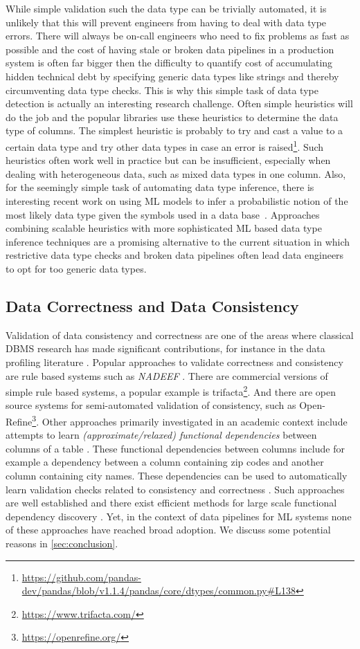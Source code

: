While simple validation such the data type can be trivially automated, it is unlikely that this will prevent engineers from having to deal with data type errors. There will always be on-call engineers who need to fix problems as fast as possible and the cost of having stale or broken data pipelines in a production system is often far bigger then the difficulty to quantify cost of accumulating hidden technical debt by specifying generic data types like strings and thereby circumventing data type checks. This is why this simple task of data type detection is actually an interesting research challenge. Often simple heuristics will do the job and the popular libraries use these heuristics to determine the data type of columns. The simplest heuristic is probably to try and cast a value to a certain data type and try other data types in case an error is raised\footnote{\url{https://github.com/pandas-dev/pandas/blob/v1.1.4/pandas/core/dtypes/common.py\#L138}}. Such heuristics often work well in practice but can be insufficient, especially when dealing with heterogeneous data, such as mixed data types in one column. Also, for the seemingly simple task of automating data type inference, there is interesting recent work on using ML models to infer a probabilistic notion of the most likely data type given the symbols used in a data base~\cite{Ceritli2020}. Approaches combining scalable heuristics with more sophisticated ML based data type inference techniques are a promising alternative to the current situation in which restrictive data type checks and broken data pipelines often lead data engineers to opt for too generic data types.

\subsection{Data Correctness and Data Consistency}

Validation of data consistency and correctness are one of the areas where classical DBMS research has made significant contributions, for instance in the data profiling literature \cite{Abedjan2018}. Popular approaches to validate correctness and consistency are rule based systems such as {\em NADEEF} \cite{Dallachiesat2013}. There are commercial versions of simple rule based systems, a popular example is trifacta\footnote{\url{https://www.trifacta.com/}}. And there are open source systems for semi-automated validation of consistency, such as Open-Refine\footnote{\url{https://openrefine.org/}}. Other approaches primarily investigated in an academic context include attempts to learn {\em (approximate/relaxed) functional dependencies} between columns of a table \cite{Papenbrock2015}. These functional dependencies between columns include for example a dependency between a column containing zip codes and another column containing city names. These dependencies can be used to automatically learn validation checks related to consistency and correctness \cite{Rekatsinas2017}. Such approaches are well established and there exist efficient methods for large scale functional dependency discovery \cite{Kruse2018}. Yet, in the context of data pipelines for ML systems none of these approaches have reached broad adoption. We discuss some potential reasons in \autoref{sec:conclusion}.

